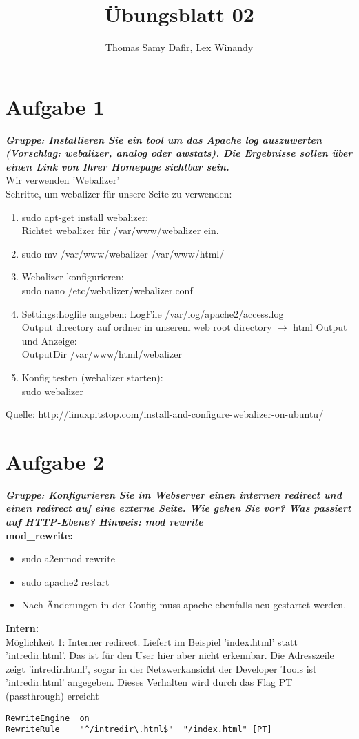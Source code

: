 \documentclass[12pt, a4paper]{report}
\title{Übungsblatt 02}
\author{Thomas Samy Dafir, Lex Winandy}
\date{}
\begin{document}
\maketitle

\section*{Aufgabe 1}
\textbf{\textit{Gruppe: Installieren Sie ein tool um das Apache log auszuwerten (Vorschlag: webalizer, analog oder awstats). Die Ergebnisse sollen über einen Link von Ihrer Homepage sichtbar sein.}}\\
Wir verwenden 'Webalizer'\\
Schritte, um webalizer für unsere Seite zu verwenden:\\
\begin{enumerate}
	\item sudo apt-get install webalizer:\\
	Richtet webalizer für /var/www/webalizer ein.
	\item sudo mv /var/www/webalizer /var/www/html/
	\item Webalizer konfigurieren:\\
	sudo nano /etc/webalizer/webalizer.conf
	\item Settings:Logfile angeben:
	LogFile /var/log/apache2/access.log\\
	Output directory auf ordner in unserem web root directory $\rightarrow$ html Output und Anzeige:\\
	OutputDir /var/www/html/webalizer
	\item Konfig testen (webalizer starten):\\
	sudo webalizer
\end{enumerate}
Quelle: http://linuxpitstop.com/install-and-configure-webalizer-on-ubuntu/


\section*{Aufgabe 2}
\textbf{\textit{Gruppe: Konfigurieren Sie im Webserver einen internen redirect und einen redirect auf eine externe Seite. Wie gehen Sie vor? Was passiert auf HTTP-Ebene? Hinweis: mod rewrite}}\\

\textbf{mod\_rewrite:}
\begin{itemize}
	\item sudo a2enmod rewrite
	\item sudo apache2 restart
	\item Nach Änderungen in der Config muss apache ebenfalls neu gestartet werden.
\end{itemize}
\textbf{Intern:}\\
Möglichkeit 1:
Interner redirect. Liefert im Beispiel 'index.html' statt 'intredir.html'. Das ist für den User hier aber
nicht erkennbar. Die Adresszeile zeigt 'intredir.html', sogar in der Netzwerkansicht der Developer Tools ist
'intredir.html' angegeben. Dieses Verhalten wird durch das Flag PT (passthrough) erreicht
\begin{verbatim}
RewriteEngine  on
RewriteRule    "^/intredir\.html$"  "/index.html" [PT]
\end{verbatim}
\end{document}
